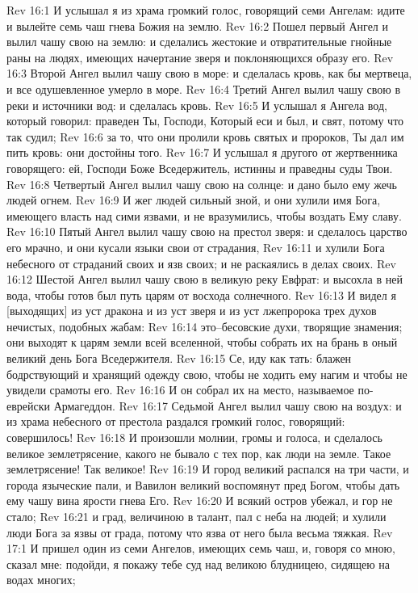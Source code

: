 Rev 16:1  И услышал я из храма громкий голос, говорящий семи Ангелам: идите и вылейте семь чаш гнева Божия на землю.
Rev 16:2  Пошел первый Ангел и вылил чашу свою на землю: и сделались жестокие и отвратительные гнойные раны на людях, имеющих начертание зверя и поклоняющихся образу его.
Rev 16:3  Второй Ангел вылил чашу свою в море: и сделалась кровь, как бы мертвеца, и все одушевленное умерло в море.
Rev 16:4  Третий Ангел вылил чашу свою в реки и источники вод: и сделалась кровь.
Rev 16:5  И услышал я Ангела вод, который говорил: праведен Ты, Господи, Который еси и был, и свят, потому что так судил;
Rev 16:6  за то, что они пролили кровь святых и пророков, Ты дал им пить кровь: они достойны того.
Rev 16:7  И услышал я другого от жертвенника говорящего: ей, Господи Боже Вседержитель, истинны и праведны суды Твои.
Rev 16:8  Четвертый Ангел вылил чашу свою на солнце: и дано было ему жечь людей огнем.
Rev 16:9  И жег людей сильный зной, и они хулили имя Бога, имеющего власть над сими язвами, и не вразумились, чтобы воздать Ему славу.
Rev 16:10  Пятый Ангел вылил чашу свою на престол зверя: и сделалось царство его мрачно, и они кусали языки свои от страдания,
Rev 16:11  и хулили Бога небесного от страданий своих и язв своих; и не раскаялись в делах своих.
Rev 16:12  Шестой Ангел вылил чашу свою в великую реку Евфрат: и высохла в ней вода, чтобы готов был путь царям от восхода солнечного.
Rev 16:13  И видел я [выходящих] из уст дракона и из уст зверя и из уст лжепророка трех духов нечистых, подобных жабам:
Rev 16:14  это--бесовские духи, творящие знамения; они выходят к царям земли всей вселенной, чтобы собрать их на брань в оный великий день Бога Вседержителя.
Rev 16:15  Се, иду как тать: блажен бодрствующий и хранящий одежду свою, чтобы не ходить ему нагим и чтобы не увидели срамоты его.
Rev 16:16  И он собрал их на место, называемое по-еврейски Армагеддон.
Rev 16:17  Седьмой Ангел вылил чашу свою на воздух: и из храма небесного от престола раздался громкий голос, говорящий: совершилось!
Rev 16:18  И произошли молнии, громы и голоса, и сделалось великое землетрясение, какого не бывало с тех пор, как люди на земле. Такое землетрясение! Так великое!
Rev 16:19  И город великий распался на три части, и города языческие пали, и Вавилон великий воспомянут пред Богом, чтобы дать ему чашу вина ярости гнева Его.
Rev 16:20  И всякий остров убежал, и гор не стало;
Rev 16:21  и град, величиною в талант, пал с неба на людей; и хулили люди Бога за язвы от града, потому что язва от него была весьма тяжкая.
Rev 17:1  И пришел один из семи Ангелов, имеющих семь чаш, и, говоря со мною, сказал мне: подойди, я покажу тебе суд над великою блудницею, сидящею на водах многих;
